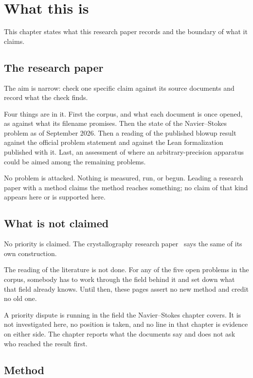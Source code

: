 \chapter{What this is}

This chapter states what this research paper records and the boundary of what it claims.

\section{The research paper}

The aim is narrow: check one specific claim against its source documents and record what the check
finds.

Four things are in it. First the corpus, and what each document is once opened, as against what its
filename promises. Then the state of the Navier--Stokes problem as of September 2026. Then a reading
of the published blowup result against the official problem statement and against the Lean
formalization published with it. Last, an assessment of where an arbitrary-precision apparatus could
be aimed among the remaining problems.

No problem is attacked. Nothing is measured, run, or begun. Leading a research paper with a method
claims the method reaches something; no claim of that kind appears here or is supported here.

\section{What is not claimed}

No priority is claimed. The crystallography research paper~\cite{src:Quigg-crystallography} says the
same of its own construction.

The reading of the literature is not done. For any of the five open problems in the corpus, somebody
has to work through the field behind it and set down what that field already knows. Until then,
these pages assert no new method and credit no old one.

A priority dispute is running in the field the Navier--Stokes chapter covers. It is not investigated
here, no position is taken, and no line in that chapter is evidence on either side. The chapter
reports what the documents say and does not ask who reached the result first.

\section{Method}

